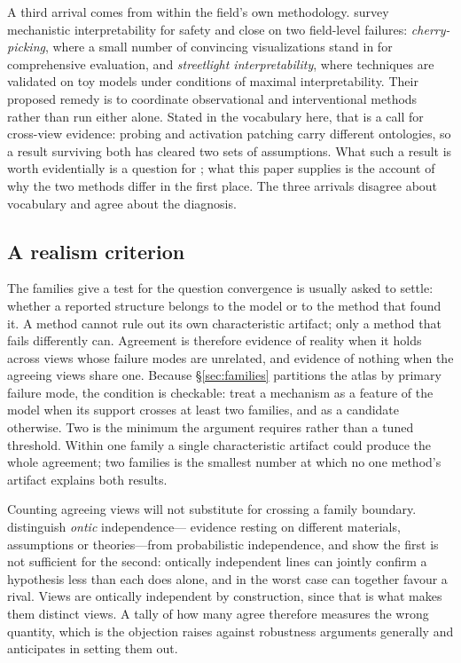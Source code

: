 \documentclass{article}
\begin{document}
A third arrival comes from within the field's own methodology.
\citet{bereska2024} survey mechanistic interpretability for safety and
close on two field-level failures: \emph{cherry-picking}, where a small
number of convincing visualizations stand in for comprehensive
evaluation, and \emph{streetlight interpretability}, where techniques are
validated on toy models under conditions of maximal interpretability.
Their proposed remedy is to coordinate observational and interventional
methods rather than run either alone.  Stated in the vocabulary here,
that is a call for cross-view evidence: probing and activation patching
carry different ontologies, so a result surviving both has cleared two
sets of assumptions.  What such a result is worth evidentially is a
question for \citet{tower2026mechvalidity}; what this paper supplies is
the account of why the two methods differ in the first place.  The three
arrivals disagree about vocabulary and agree about the diagnosis.

\subsection{A realism criterion}
The families give a test for the question convergence is usually asked to
settle: whether a reported structure belongs to the model or to the method
that found it.  A method cannot rule out its own characteristic artifact;
only a method that fails differently can.  Agreement is therefore evidence
of reality when it holds across views whose failure modes are unrelated,
and evidence of nothing when the agreeing views share one.  Because
\S\ref{sec:families} partitions the atlas by primary failure mode, the
condition is checkable: treat a mechanism as a feature of the model when
its support crosses at least two families, and as a candidate otherwise.
Two is the minimum the argument requires rather than a tuned threshold.
Within one family a single characteristic artifact could produce the whole
agreement; two families is the smallest number at which no one method's
artifact explains both results.

Counting agreeing views will not substitute for crossing a family
boundary.  \citet{stegenga2017} distinguish \emph{ontic} independence---%
evidence resting on different materials, assumptions or theories---from
probabilistic independence, and show the first is not sufficient for the
second: ontically independent lines can jointly confirm a hypothesis less
than each does alone, and in the worst case can together favour a rival.
Views are ontically independent by construction, since that is what makes
them distinct views.  A tally of how many agree therefore measures the
wrong quantity, which is the objection \citet{stegenga2009} raises against
robustness arguments generally and \citet{wimsatt1981} anticipates in
setting them out.
\end{document}

